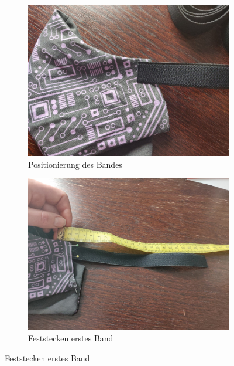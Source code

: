 \documentclass[12pt,parskip=full]{scrartcl}
\begin{document}
\begin{figure}[ht]
    \vspace{0.5cm}
    \centering
    \begin{subfigure}{0.48\textwidth}
        \centering
        \includegraphics[width = \linewidth]{Pictures/10_Straps/Straps1_resized.jpg}
        \caption{Positionierung des Bandes}
        \label{Strap1}
    \end{subfigure}
    \begin{subfigure}{0.48\textwidth}
        \centering
        \includegraphics[width = \linewidth]{Pictures/10_Straps/Straps2_resized.jpg}
        \caption{Feststecken erstes Band}
        \label{Strap2}
    \end{subfigure}

\end{figure}
\end{document}
